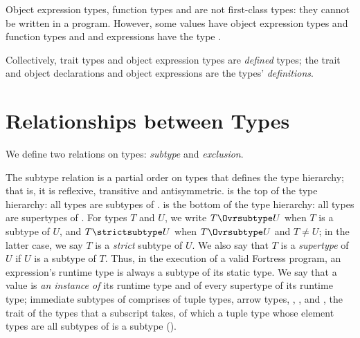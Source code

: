 Object expression types, function types and 
are not first-class types: they cannot be written in a program.
However, some values have object expression types and function types
and  and  expressions have the type .

Collectively,
trait types and object expression types are \emph{defined} types;
the trait and object declarations and object expressions
are the types' \emph{definitions}.


\section{Relationships between Types}

We define two relations on types: \emph{subtype} and \emph{exclusion}.

The subtype relation is a partial order on types
that defines the type hierarchy;
that is,
it is reflexive, transitive and antisymmetric.
 is the top of the type hierarchy:
all types are subtypes of .
 is the bottom of the type hierarchy:
all types are supertypes of .
For types $T$ and $U$,
we write $T \Ovrsubtype U$ when $T$ is a subtype of $U$,
and $T \strictsubtype U$ when $T \Ovrsubtype U$ and $T \neq U$;
in the latter case,
we say $T$ is a \emph{strict} subtype of $U$.
We also say that $T$ is a \emph{supertype} of $U$ if $U$ is a subtype of $T$.
Thus, in the execution of a
valid Fortress program, an expression's runtime type is always a subtype of
its static type.
We say that a value is \emph{an instance of} its runtime
type and of every supertype of its runtime type; immediate subtypes of
 comprises of tuple types, arrow types, \TYP{()}, , and
, the trait of the types that a subscript takes, of which a tuple
type whose element types are all subtypes of  is a subtype
().

